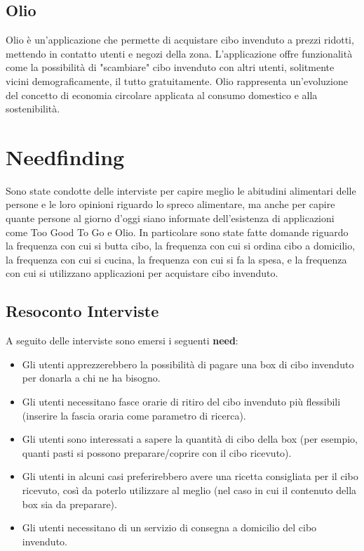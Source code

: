 \documentclass{article}
\begin{document}
\subsection{Olio}
Olio è un'applicazione che permette di acquistare cibo invenduto a prezzi ridotti, mettendo in contatto utenti e negozi della zona.
L'applicazione offre funzionalità come la possibilità di "scambiare" cibo invenduto con altri utenti, solitmente vicini demograficamente, il tutto gratuitamente.
Olio rappresenta un’evoluzione del concetto di economia circolare applicata al consumo domestico e alla sostenibilità.

\section{Needfinding}
Sono state condotte delle interviste per capire meglio le abitudini alimentari delle persone e le loro opinioni riguardo lo spreco alimentare, ma anche per capire quante persone al giorno d'oggi siano informate dell'esistenza di applicazioni come Too Good To Go e Olio.
In particolare sono state fatte domande riguardo la frequenza con cui si butta cibo, la frequenza con cui si ordina cibo a domicilio, la frequenza con cui si cucina, la frequenza con cui si fa la spesa, e la frequenza con cui si utilizzano applicazioni per acquistare cibo invenduto.

\subsection{Resoconto Interviste}
A seguito delle interviste sono emersi i seguenti \textbf{need}:
\begin{itemize}
    \item Gli utenti apprezzerebbero la possibilità di pagare una box di cibo invenduto per donarla a chi ne ha bisogno.
    \item Gli utenti necessitano fasce orarie di ritiro del cibo invenduto più flessibili (inserire la fascia oraria come parametro di ricerca).
    \item Gli utenti sono interessati a sapere la quantità di cibo della box (per esempio, quanti pasti si possono preparare/coprire con il cibo ricevuto).
    \item Gli utenti in alcuni casi preferirebbero avere una ricetta consigliata per il cibo ricevuto, così da poterlo utilizzare al meglio (nel caso in cui il contenuto della box sia da preparare).
    \item Gli utenti necessitano di un servizio di consegna a domicilio del cibo invenduto.
\end{itemize}
\end{document}
